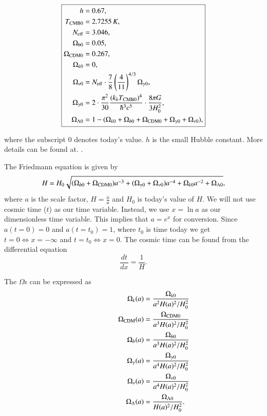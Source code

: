 \documentclass{aa}
\begin{document}
\begin{equation}
      \boxed{
   \begin{aligned}
      h &= 0.67, \\
      T_{\rm CMB 0} &= 2.7255\,K, \\
      N_{\rm eff} &= 3.046, \\
      \Omega_{\rm b 0} &= 0.05, \\
      \Omega_{\rm CDM 0} &= 0.267,\\
      \Omega_{k 0} &= 0, \\
      \Omega_{\nu 0} &= N_{\rm eff}\cdot \frac{7}{8}\left(\frac{4}{11}\right)^{4/3}\Omega_{\gamma 0}, \\
      \Omega_{\gamma 0} &= 2\cdot \frac{\pi^2}{30} \frac{(k_bT_{\rm CMB 0})^4}{\hbar^3 c^5} \cdot \frac{8\pi G}{3H_0^2},\\
      \Omega_{\Lambda 0} &= 1 - (\Omega_{k 0}+\Omega_{b 0}+\Omega_{\rm CDM 0}+\Omega_{\gamma 0}+\Omega_{\nu 0}),
   \end{aligned}}
\end{equation}

where the subscript 0 denotes today's value. $h$ is the small Hubble constant. More details can be found at. \cite{ThomasYoung}.

The Friedmann equation is given by
\begin{equation}\label{Friedmann}
      H = H_0 \sqrt{(\Omega_{b0}+\Omega_{\rm CDM 0})a^{-3} + (\Omega_{\gamma 0} + \Omega_{\nu 0}) a^{-4} + \Omega_{k 0} a^{-2} + \Omega_{\Lambda 0}},
\end{equation}
where $a$ is the scale factor, $H = \frac{\dot{a}}{a}$ and $H_0$ is today's value of $H$. We will not use cosmic time ($t$) as our time variable.
Instead, we use $x=\ln a$ as our dimensionless time variable. This implies that $a = e^x$ for conversion. Since $a(t=0) =0$ and $a(t=t_0) = 1$, where $t_0$ is time today
we get $t=0 \iff x = -\infty$ and $t=t_0 \iff x = 0$. The cosmic time can be found from the differential equation 
\begin{equation}\label{cosmic_time_differential_equation}
      \frac{dt}{dx} = \frac{1}{H}.
\end{equation}


The $\Omega$s can be expressed as
\begin{equation}
      \hspace*{2cm}
   \begin{aligned}
      \Omega_{k}(a) &= \frac{\Omega_{k0}}{a^2H(a)^2/H_0^2}\\
      \Omega_{\rm CDM}(a) &= \frac{\Omega_{\rm CDM 0}}{a^3H(a)^2/H_0^2} \\
      \Omega_b(a) &= \frac{\Omega_{b 0}}{a^3H(a)^2/H_0^2} \\
      \Omega_\gamma(a) &= \frac{\Omega_{\gamma 0}}{a^4H(a)^2/H_0^2} \\
      \Omega_{\nu}(a) &= \frac{\Omega_{\nu 0}}{a^4H(a)^2/H_0^2} \\
      \Omega_{\Lambda}(a) &= \frac{\Omega_{\Lambda 0}}{H(a)^2/H_0^2}.
   \end{aligned}
\end{equation}
\end{document}
